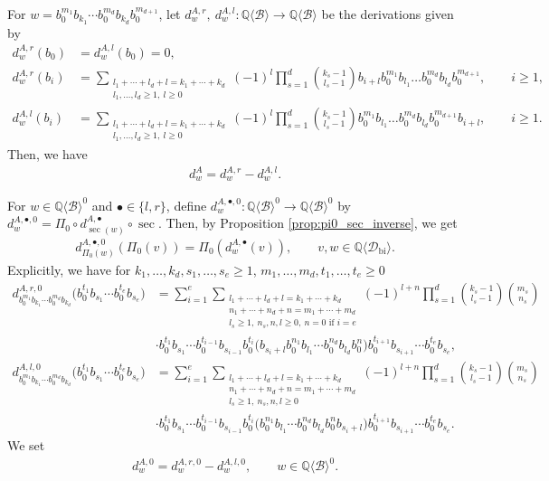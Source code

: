 \documentclass[12pt,reqno]{amsart}
\numberwithin{equation}{section}
\theoremstyle{definition}
\newcommand{\QQ}{\mathbb{Q}}
\newcommand{\B}{\mathcal{B}}
\newcommand{\QB}{\QQ\langle \B\rangle}
\newcommand{\Dbi}{\mathcal{D}_{\operatorname{bi}}}
\newcommand{\QDbi}{\QQ\langle \Dbi\rangle}
\newcommand{\der}[1]{d_{#1}^A}
\newcommand{\derr}[1]{d_{#1}^{A,r}}
\newcommand{\derl}[1]{d_{#1}^{A,l}}
\newcommand{\derzero}[1]{d_{#1}^{A,0}}
\newcommand{\derrzero}[1]{d_{#1}^{A,r,0}}
\newcommand{\derlzero}[1]{d_{#1}^{A,l,0}}
\newcommand{\derbull}[1]{d_{#1}^{A,\bullet}}
\newcommand{\derbullzero}[1]{d_{#1}^{A,\bullet,0}}
\newcommand{\pizero}{\Pi_0}
\begin{document}
For $w=b_0^{m_1}b_{k_1}\cdots b_0^{m_d}b_{k_d}b_0^{m_{d+1}}$, let $\derr{w},\ \derl{w}:\QB\to\QB$ be the derivations given by 
\begin{align}
\derr{w}(b_0)&=\derl{w}(b_0)=0, \nonumber \\
\label{eq:derr}
\derr{w}(b_i)&=\sum_{\substack{l_1+\cdots+l_d+l=k_1+\cdots+k_d\\ l_1,\ldots,l_d\geq1,\ l\geq0}}(-1)^l\prod_{s=1}^d \binom{k_s-1}{l_s-1} b_{i+l}b_0^{m_1}b_{l_1}\dots b_0^{m_d}b_{l_d}b_0^{m_{d+1}}, \qquad i\geq1, \\
\label{eq:derl}
\derl{w}(b_i)&=\sum_{\substack{l_1+\cdots+l_d+l=k_1+\cdots+k_d\\ l_1,\ldots,l_d\geq1,\ l\geq0}}(-1)^l\prod_{s=1}^d \binom{k_s-1}{l_s-1} b_0^{m_1}b_{l_1}\dots b_0^{m_d}b_{l_d}b_0^{m_{d+1}}b_{i+l}, \qquad i\geq1.
\end{align}
Then, we have
\begin{align} \label{eq:dA_in_dAl_dAr}
\der{w}=\derr{w}-\derl{w}.
\end{align}


For $w\in \QB^0$ and $\bullet\in \{l,r\}$, define $\derbullzero{w}:\QB^0\to \QB^0$ by $
\derbullzero{w}=\pizero\circ \derbull{\sec(w)}\circ\sec$. Then, by Proposition \ref{prop:pi0_sec_inverse}, we get
\begin{align*}
\derbullzero{\pizero(w)}(\pizero(v))=\pizero(\derbull{w}(v)), \qquad v,w\in \QDbi.
\end{align*}
Explicitly, we have for $k_1,\ldots,k_d,s_1,\ldots,s_e\geq1$, $m_1,\ldots,m_d,t_1,\ldots,t_e\geq0$
\begin{align} 
\label{eq:dAr0_expl}
\derrzero{b_0^{m_1}b_{k_1}\cdots b_0^{m_d}b_{k_d}}\big(b_0^{t_1}b_{s_1}\cdots b_0^{t_e}b_{s_e}\big)&=\sum_{i=1}^e \sum_{\substack{l_1+\cdots+l_d+l=k_1+\cdots+k_d \\ n_1+\cdots+n_d+n=m_1+\cdots+m_d \\ l_s\geq1,\ n_s,n,l\geq0, \ n=0 \text{ if } i=e}} (-1)^{l+n} \prod_{s=1}^d \binom{k_s-1}{l_s-1}\binom{m_s}{n_s} \\
&\cdot b_0^{t_1}b_{s_1}\cdots b_0^{t_{i-1}}b_{s_{i-1}}b_0^{t_i}\big(b_{s_i+l}b_0^{n_1}b_{l_1}\cdots b_0^{n_d}b_{l_d}b_0^n\big)b_0^{t_{i+1}}b_{s_{i+1}}\cdots b_0^{t_e}b_{s_e}, \nonumber \\
\label{eq:dAl0_expl}
\derlzero{b_0^{m_1}b_{k_1}\cdots b_0^{m_d}b_{k_d}}\big(b_0^{t_1}b_{s_1}\cdots b_0^{t_e}b_{s_e}\big)&=\sum_{i=1}^e \sum_{\substack{l_1+\cdots+l_d+l=k_1+\cdots+k_d \\ n_1+\cdots+n_d+n=m_1+\cdots+m_d \\ l_s\geq1,\ n_s,n,l\geq0}} (-1)^{l+n} \prod_{s=1}^d \binom{k_s-1}{l_s-1}\binom{m_s}{n_s} \\
&\cdot b_0^{t_1}b_{s_1}\cdots b_0^{t_{i-1}}b_{s_{i-1}}b_0^{t_i}\big(b_0^{n_1}b_{l_1}\cdots b_0^{n_d}b_{l_d}b_0^nb_{s_i+l}\big)b_0^{t_{i+1}}b_{s_{i+1}}\cdots b_0^{t_e}b_{s_e}. \nonumber 
\end{align}
We set
\begin{align} \label{eq:derzero}
\derzero{w}=\derrzero{w}-\derlzero{w},\qquad w\in\QB^0.
\end{align}
\end{document}
